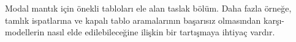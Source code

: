 


\begin{editorial}
  Modal mantık için önekli tabloları ele alan taslak bölüm. Daha fazla örneğe,
  tamlık ispatlarına ve kapalı tablo aramalarının başarısız olmasından
  karşı-modellerin nasıl elde edilebileceğine ilişkin bir tartışmaya ihtiyaç
  vardır.
\end{editorial}


\OLEndChapterHook

